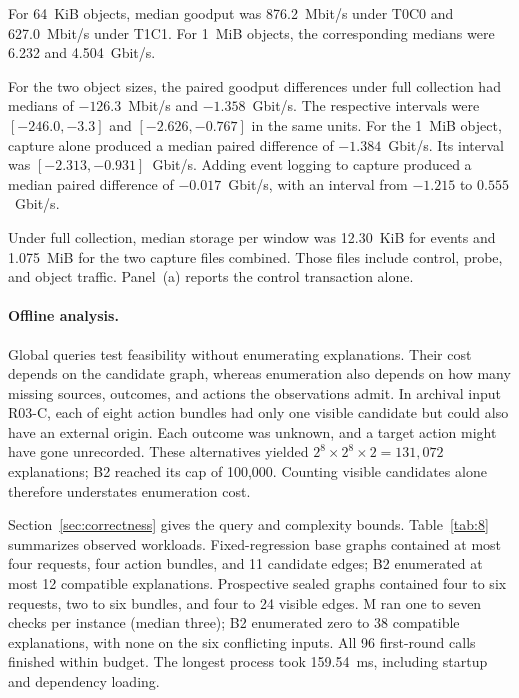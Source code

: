 For 64~KiB objects, median goodput was 876.2~Mbit/s under T0C0 and 627.0~Mbit/s under T1C1. For 1~MiB objects, the corresponding medians were 6.232 and 4.504~Gbit/s.

For the two object sizes, the paired goodput differences under full collection had medians of $-126.3$~Mbit/s and $-1.358$~Gbit/s. The respective intervals were $[-246.0, -3.3]$ and $[-2.626, -0.767]$ in the same units. For the 1~MiB object, capture alone produced a median paired difference of $-1.384$~Gbit/s. Its interval was $[-2.313, -0.931]$~Gbit/s. Adding event logging to capture produced a median paired difference of $-0.017$~Gbit/s, with an interval from $-1.215$ to $0.555$~Gbit/s.

Under full collection, median storage per window was 12.30~KiB for events and 1.075~MiB for the two capture files combined. Those files include control, probe, and object traffic. Panel~(a) reports the control transaction alone.

\paragraph{Offline analysis.} Global queries test feasibility without enumerating explanations. Their cost depends on the candidate graph, whereas enumeration also depends on how many missing sources, outcomes, and actions the observations admit. In archival input R03-C, each of eight action bundles had only one visible candidate but could also have an external origin. Each outcome was unknown, and a target action might have gone unrecorded. These alternatives yielded $2^8\times2^8\times2=131{,}072$ explanations; B2 reached its cap of 100,000. Counting visible candidates alone therefore understates enumeration cost.

Section~\ref{sec:correctness} gives the query and complexity bounds. Table~\ref{tab:8} summarizes observed workloads. Fixed-regression base graphs contained at most four requests, four action bundles, and 11 candidate edges; B2 enumerated at most 12 compatible explanations. Prospective sealed graphs contained four to six requests, two to six bundles, and four to 24 visible edges. M ran one to seven checks per instance (median three); B2 enumerated zero to 38 compatible explanations, with none on the six conflicting inputs. All 96 first-round calls finished within budget. The longest process took 159.54~ms, including startup and dependency loading.

